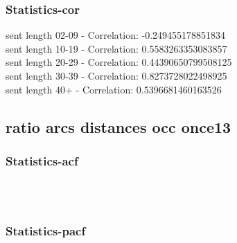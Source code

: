 \documentclass{article}%
\begin{document}
%
\newpage%
\subsubsection{Statistics{-}cor}%
\label{ssubsec:Statistics{-}cor}%
\noindent%
sent length 02-09 - Correlation: -0.249455178851834\\%
sent length 10-19 - Correlation: 0.5583263353083857\\%
sent length 20-29 - Correlation: 0.44390650799508125\\%
sent length 30-39 - Correlation: 0.8273728022498925\\%
sent length 40+ - Correlation: 0.5396681460163526\\

%
\newpage

%
\subsection{ratio arcs distances occ once13}%
\label{subsec:ratioarcsdistancesocconce13}%
\subsubsection{Statistics{-}acf}%
\label{ssubsec:Statistics{-}acf}%


\begin{figure}[ht]%
\centering%
\setlength{\abovecaptionskip}{-35pt}%
%
%
\\%
%
%
\\%
%
\end{figure}

%
\newpage%
\subsubsection{Statistics{-}pacf}%
\label{ssubsec:Statistics{-}pacf}%
\end{document}
